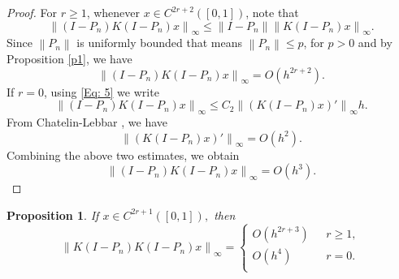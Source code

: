 \documentclass[sn-mathphys-num]{sn-jnl}%
\theoremstyle{thmstyleone}%
\newtheorem{proposition}[theorem]{Proposition}%
\theoremstyle{thmstyletwo}%
\theoremstyle{thmstylethree}%
\newcommand{\norm}[1]{\left\lVert #1\right\rVert}
\begin{document}
\begin{proof}
	For $r \ge 1$, whenever $x \in C^{2r+2}([0,1])$, note that
	$$
	\norm{(I-P_n)K(I-P_n)x}_\infty \le \norm{I-P_n} \norm{K(I-P_n)x}_\infty.
	$$
	Since $\norm{P_n}$ is uniformly bounded that means $\norm{P_n} \le p$, for $p > 0$ and by Proposition \eqref{p1}, we have
	$$
	\norm{(I-P_n)K(I-P_n)x}_\infty =O(h^{2r+2}).
	$$
	If $r=0$, using \eqref{Eq: 5} we write 
	$$
	\norm{(I-P_n)K(I-P_n)x}_\infty \le C_2 \norm{(K(I-P_n)x)'}_\infty h.
	$$
	From Chatelin-Lebbar \cite[Theorem 15]{Cha-Leb2}, we have 
	$$
	\norm{(K(I-P_n)x)'}_\infty = O(h^2).
	$$
	Combining the above two estimates, we obtain
	$$
	\norm{(I-P_n)K(I-P_n)x}_\infty = O(h^3).
	$$
\end{proof}
\begin{proposition} \label{p3}
	If $x \in C^{2r+1}([0,1]),$ then
	\begin{equation*}
		\norm{K(I-P_n)K(I-P_n)x }_\infty = \begin{cases}
			O(h^{2r+3})~~~          &  r \ge 1,\\
			O(h^4)~~~          & r=0.\\
		\end{cases}
	\end{equation*}
\end{proposition}
\end{document}
